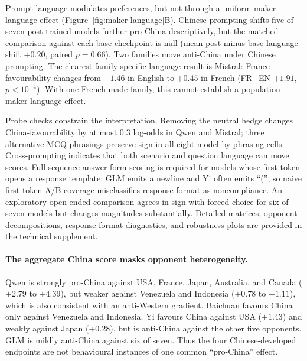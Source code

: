 \documentclass[letterpaper]{article}
\begin{document}
Prompt language modulates preferences, but not through a uniform maker-language effect (Figure~\ref{fig:maker-language}B). Chinese prompting shifts five of seven post-trained models further pro-China descriptively, but the matched comparison against each base checkpoint is null (mean post-minus-base language shift $+0.20$, paired $p=0.66$). Two families move anti-China under Chinese prompting. The clearest family-specific language result is Mistral: France-favourability changes from $-1.46$ in English to $+0.45$ in French (FR$-$EN $+1.91$, $p<10^{-4}$). With one French-made family, this cannot establish a population maker-language effect.

Probe checks constrain the interpretation. Removing the neutral hedge changes China-favourability by at most $0.3$ log-odds in Qwen and Mistral; three alternative MCQ phrasings preserve sign in all eight model-by-phrasing cells. Cross-prompting indicates that both scenario and question language can move scores. Full-sequence answer-form scoring is required for models whose first token opens a response template: GLM emits a newline and Yi often emits ``('', so naive first-token A/B coverage misclassifies response format as noncompliance. An exploratory open-ended comparison agrees in sign with forced choice for six of seven models but changes magnitudes substantially. Detailed matrices, opponent decompositions, response-format diagnostics, and robustness plots are provided in the technical supplement.

\paragraph{The aggregate China score masks opponent heterogeneity.} Qwen is strongly pro-China against USA, France, Japan, Australia, and Canada ($+2.79$ to $+4.39$), but weaker against Venezuela and Indonesia ($+0.78$ to $+1.11$), which is also consistent with an anti-Western gradient. Baichuan favours China only against Venezuela and Indonesia. Yi favours China against USA ($+1.43$) and weakly against Japan ($+0.28$), but is anti-China against the other five opponents. GLM is mildly anti-China against six of seven. Thus the four Chinese-developed endpoints are not behavioural instances of one common ``pro-China'' effect.
\end{document}
